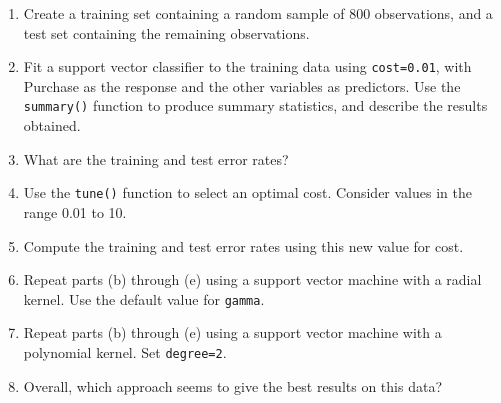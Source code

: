 \documentclass[]{article}
\begin{document}
\begin{enumerate}
\def\labelenumi{(\alph{enumi})}
\item
  Create a training set containing a random sample of 800 observations,
  and a test set containing the remaining observations.
\item
  Fit a support vector classifier to the training data using
  \texttt{cost=0.01}, with Purchase as the response and the other
  variables as predictors. Use the \texttt{summary()} function to
  produce summary statistics, and describe the results obtained.
\item
  What are the training and test error rates?
\item
  Use the \texttt{tune()} function to select an optimal cost. Consider
  values in the range 0.01 to 10.
\item
  Compute the training and test error rates using this new value for
  cost.
\item
  Repeat parts (b) through (e) using a support vector machine with a
  radial kernel. Use the default value for \texttt{gamma}.
\item
  Repeat parts (b) through (e) using a support vector machine with a
  polynomial kernel. Set \texttt{degree=2}.
\item
  Overall, which approach seems to give the best results on this data?
\end{enumerate}
\end{document}
